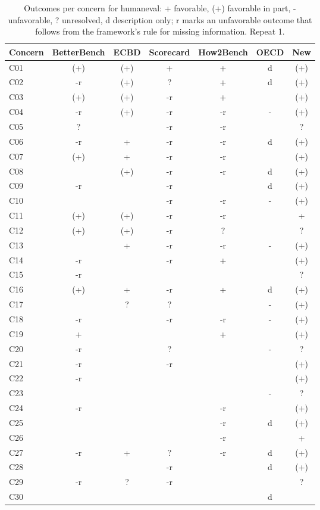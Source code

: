 \begin{table}[t]
\caption{Outcomes per concern for humaneval: + favorable, (+) favorable in part, - unfavorable, ? unresolved, d description only; r marks an unfavorable outcome that follows from the framework's rule for missing information. Repeat 1.}
\label{tab:grid-humaneval}
\small\centering\begin{tabular}{lcccccc}\toprule
Concern & BetterBench & ECBD & Scorecard & How2Bench & OECD & New \\
\midrule
C01 & (+) & (+) & + & + & d & (+) \\
C02 & -r & (+) & ? & + & d & (+) \\
C03 & (+) & (+) & -r & + &  & (+) \\
C04 & -r & (+) & -r & -r & - & (+) \\
C05 & ? &  & -r & -r &  & ? \\
C06 & -r & + & -r & -r & d & (+) \\
C07 & (+) & + & -r & -r &  & (+) \\
C08 &  & (+) & -r & -r & d & (+) \\
C09 & -r &  & -r &  & d & (+) \\
C10 &  &  & -r & -r & - & (+) \\
C11 & (+) & (+) & -r & -r &  & + \\
C12 & (+) & (+) & -r & ? &  & ? \\
C13 &  & + & -r & -r & - & (+) \\
C14 & -r &  & -r & + &  & (+) \\
C15 & -r &  &  &  &  & ? \\
C16 & (+) & + & -r & + & d & (+) \\
C17 &  & ? & ? &  & - & (+) \\
C18 & -r &  & -r & -r & - & (+) \\
C19 & + &  &  & + &  & (+) \\
C20 & -r &  & ? &  & - & ? \\
C21 & -r &  & -r &  &  & (+) \\
C22 & -r &  &  &  &  & (+) \\
C23 &  &  &  &  & - & ? \\
C24 & -r &  &  & -r &  & (+) \\
C25 &  &  &  & -r & d & (+) \\
C26 &  &  &  & -r &  & + \\
C27 & -r & + & ? & -r & d & (+) \\
C28 &  &  & -r &  & d & (+) \\
C29 & -r & ? & -r &  &  & ? \\
C30 &  &  &  &  & d &  \\
\bottomrule\end{tabular}
\end{table}
